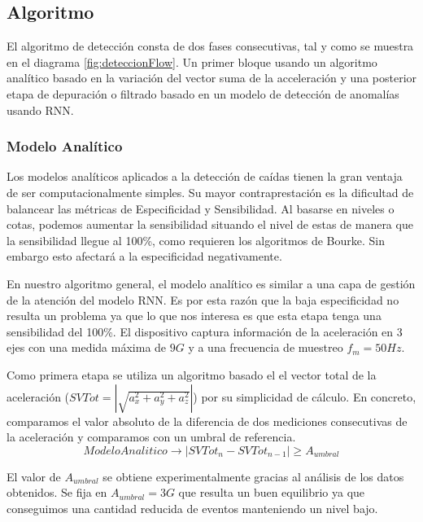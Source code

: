 \documentclass[../tfm.tex]{subfiles}
\begin{document}
\subsection{Algoritmo}\label{desc_modelo}

El algoritmo de detección consta de dos fases consecutivas, tal y como se muestra en el diagrama \ref{fig:deteccionFlow}. Un primer bloque usando un algoritmo analítico basado en la variación del vector suma de la acceleración y una posterior etapa de depuración o filtrado basado en un modelo de detección de anomalías usando RNN.


\subsubsection{Modelo Analítico}

Los modelos analíticos aplicados a la detección de caídas tienen la gran ventaja de ser computacionalmente simples. Su mayor contraprestación es la dificultad de balancear las métricas de Especificidad y Sensibilidad. Al basarse en niveles o cotas, podemos aumentar la sensibilidad situando el nivel de estas de manera que la sensibilidad llegue al 100\%, como requieren los algoritmos de Bourke\cite{Bourke2006}. Sin embargo esto afectará a la especificidad negativamente\cite{Aziz2017}.


En nuestro algoritmo general, el modelo analítico es similar a una capa de gestión de la atención del modelo RNN. Es por esta razón que la baja especificidad  no resulta un problema ya que lo que nos interesa es que esta etapa tenga una sensibilidad del 100\%. El dispositivo captura información de la aceleración en 3 ejes con una medida máxima de $9G$ y a una frecuencia de muestreo $f_m=50Hz$.

Como primera etapa se utiliza un algoritmo basado el el vector total de la aceleración ($SVTot = |\sqrt{a_{x}^2+a_{y}^2+a_{z}^2}|$) por su simplicidad de cálculo. En concreto, comparamos el valor absoluto de la diferencia de dos mediciones consecutivas de la aceleración y comparamos con un umbral de referencia.
\[
ModeloAnalitico\rightarrow |SVTot_n - SVTot_{n-1}|\geq A_{umbral}
\]

El valor de $A_{umbral}$ se obtiene experimentalmente gracias al análisis de los datos obtenidos. Se fija en $A_{umbral} = 3G$ que resulta un buen equilibrio ya que conseguimos una cantidad reducida de eventos manteniendo un nivel bajo. 
\end{document}
